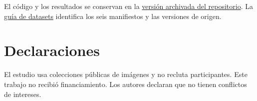\documentclass[a4paper,fleqn]{cas-sc}
\begin{document}
El código y los resultados se conservan en la \href{https://github.com/Joafp/concatenacion-descriptores-texturas/tree/97e4a8a4fe3b551f529a6e1f8814f6125cccaf78}{versión archivada del repositorio}. La \href{https://github.com/Joafp/concatenacion-descriptores-texturas/blob/main/carlos/revision_paper/DATA_AVAILABILITY.md}{guía de datasets} identifica los seis manifiestos y las versiones de origen.

\section*{Declaraciones}

El estudio usa colecciones públicas de imágenes y no recluta participantes. Este trabajo no recibió financiamiento. Los autores declaran que no tienen conflictos de intereses.



\end{document}
